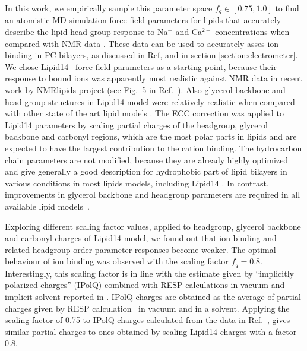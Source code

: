 \documentclass[aip,jcp,twocolumn]{revtex4}
\begin{document}
In this work, we empirically sample this parameter space $f_q \in [0.75, 1.0]$
to find an atomistic MD simulation force field parameters for lipids that
accurately describe the lipid head group response to Na$^+$ and Ca$^{2+}$ concentrations
when compared with NMR data \cite{akutsu81,altenbach84}. These data can be used to accurately asses
ion binding in PC bilayers, as discussed in Ref,  and in section \ref{section:electrometer}.
We chose Lipid14~\cite{dickson14} force field parameters as a starting point,
because their response to bound ions was apparently most realistic against NMR data
in recent work by NMRlipids project (see Fig.~5 in Ref.~).
Also glycerol backbone and head group structures in Lipid14 model were
relatively realistic when compared with other state of the art lipid models \cite{botan15}.
The ECC correction was applied to Lipid14 parameters by scaling partial charges of the headgroup,
glycerol backbone and carbonyl regions, which are the most polar parts in lipids and
are expected to have the largest contribution to the cation binding.
The hydrocarbon chain parameters are not modified, because they are
already highly optimized and give generally a good description for
hydrophobic part of lipid bilayers in various conditions
in most lipids models, including Lipid14 \cite{ollila16}.
In contrast, improvements in glycerol backbone and headgroup
parameters are required in all available lipid models~\cite{botan15}. 

Exploring different scaling factor values, applied to headgroup, glycerol backbone
and carbonyl charges of Lipid14 model, we found out that ion binding and
related headgroup order parameter responses become weaker. 
The optimal behaviour of ion binding was observed with
the scaling factor $f_q = 0.8$. %
Interestingly, this scaling factor is in line with the estimate
given by ``implicitly polarized charges'' (IPolQ) \cite{ipolq2013}
combined with RESP calculations in vacuum and implicit solvent reported
in \cite{maciejewski14}. IPolQ charges are obtained as the average of
partial charges given by RESP calculation~\cite{RESP_paper}
in vacuum and in a solvent. Applying the scaling factor of 0.75 to
IPolQ charges calculated from the data in Ref.~\cite{maciejewski14},
gives similar partial charges to ones obtained by scaling Lipid14 charges
with a factor 0.8.
\end{document}
